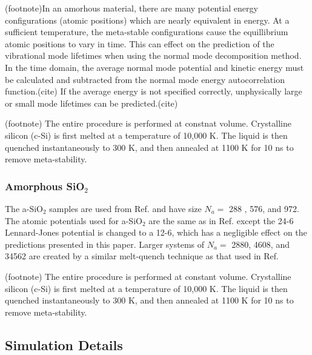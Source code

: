 \documentclass[aps,prb,twocolumn,superscriptaddress,footinbib,amsmath,amssymb,floatfix]{revtex4}
\begin{document}
(footnote)In an amorhous material, there are many potential energy 
configurations 
(atomic positions) which are nearly equivalent in energy.  At a sufficient 
temperature, the meta-stable configurations cause the equillibrium 
atomic positions to vary in time.  This can effect on the prediction of 
the vibrational mode 
lifetimes when using the normal 
mode decomposition method. In the time domain, the average normal 
mode potential and kinetic energy must be calculated and subtracted 
from the normal mode energy autocorrelation function.(cite) 
If the average 
energy is not specified correctly, unphysically large or small mode 
lifetimes can be predicted.(cite) 

(footnote)
The entire procedure is performed at constnat volume. Crystalline 
silicon (c-Si) is first 
melted at a temperature of 10,000 K. The liquid is then quenched 
instantaneously to 300 K, and then annealed at 1100 K for 10 ns to remove 
meta-stability. 

\subsubsection{\label{S:Sample:SiO2}Amorphous SiO$_2$}

The a-SiO$_2$ samples are used from Ref.  
and have size $N_a =$ 288 , 576, and 972. The atomic potentials used 
for a-SiO$_2$ are the same as in Ref. 
 except the 24-6 
Lennard-Jones potential is changed to a 12-6, 
which has a negligible effect on the predictions presented in this paper. 
Larger systems of $N_a = $ 2880, 4608, and 34562 are created by a similar 
melt-quench technique as that used in Ref.  

(footnote)
The entire procedure is performed at constant volume. Crystalline 
silicon (c-Si) is first 
melted at a temperature of 10,000 K. The liquid is then quenched 
instantaneously to 300 K, and then annealed at 1100 K for 10 ns to remove 
meta-stability. 

\subsection{\label{S:Simulation}Simulation Details}
\end{document}
